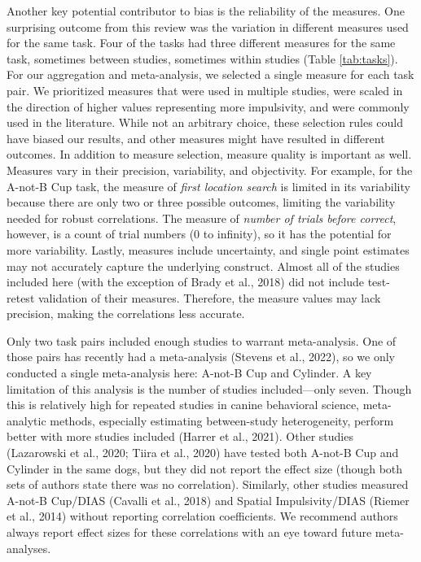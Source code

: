 \documentclass[
  ,pub,floatsintext]{apa6}
\begin{document}
Another key potential contributor to bias is the reliability of the measures. One surprising outcome from this review was the variation in different measures used for the same task. Four of the tasks had three different measures for the same task, sometimes between studies, sometimes within studies (Table \ref{tab:tasks}). For our aggregation and meta-analysis, we selected a single measure for each task pair. We prioritized measures that were used in multiple studies, were scaled in the direction of higher values representing more impulsivity, and were commonly used in the literature. While not an arbitrary choice, these selection rules could have biased our results, and other measures might have resulted in different outcomes. In addition to measure selection, measure quality is important as well. Measures vary in their precision, variability, and objectivity. For example, for the A-not-B Cup task, the measure of \emph{first location search} is limited in its variability because there are only two or three possible outcomes, limiting the variability needed for robust correlations. The measure of \emph{number of trials before correct}, however, is a count of trial numbers (0 to infinity), so it has the potential for more variability. Lastly, measures include uncertainty, and single point estimates may not accurately capture the underlying construct. Almost all of the studies included here (with the exception of Brady et al., 2018) did not include test-retest validation of their measures. Therefore, the measure values may lack precision, making the correlations less accurate.

Only two task pairs included enough studies to warrant meta-analysis. One of those pairs has recently had a meta-analysis (Stevens et al., 2022), so we only conducted a single meta-analysis here: A-not-B Cup and Cylinder. A key limitation of this analysis is the number of studies included---only seven. Though this is relatively high for repeated studies in canine behavioral science, meta-analytic methods, especially estimating between-study heterogeneity, perform better with more studies included (Harrer et al., 2021). Other studies (Lazarowski et al., 2020; Tiira et al., 2020) have tested both A-not-B Cup and Cylinder in the same dogs, but they did not report the effect size (though both sets of authors state there was no correlation). Similarly, other studies measured A-not-B Cup/DIAS (Cavalli et al., 2018) and Spatial Impulsivity/DIAS (Riemer et al., 2014) without reporting correlation coefficients. We recommend authors always report effect sizes for these correlations with an eye toward future meta-analyses.
\end{document}
